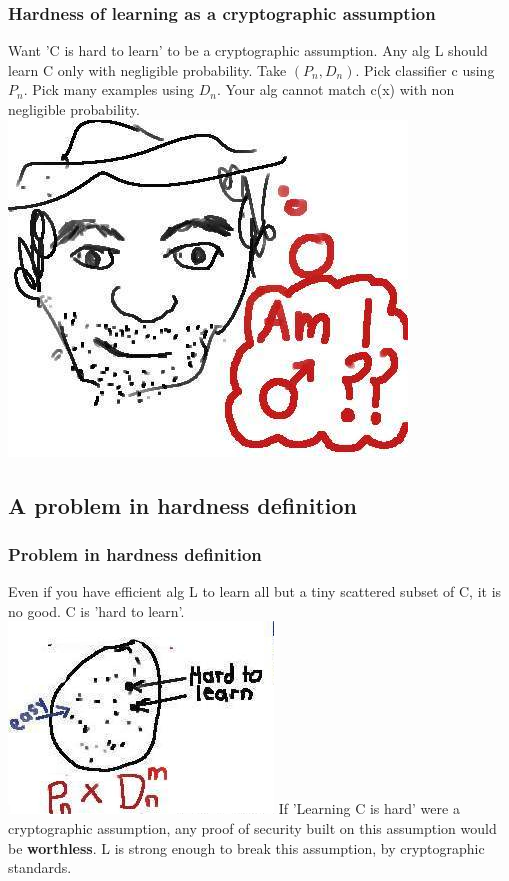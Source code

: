 \documentclass{beamer}
\begin{document}
\begin{frame}
\frametitle{Hardness of learning as a cryptographic assumption}
\begin{itemize}
\pitem Want 'C is hard to learn' to be a cryptographic assumption.
\pitem Any alg L should learn C only with negligible probability.
\pitem Take $(P_{n}, D_{n})$. Pick classifier c using $P_{n}$. Pick many examples using $D_{n}$. Your alg cannot match c(x) with non negligible probability.
\includegraphics[scale=0.065]{images/maleFace.jpg}
\end{itemize}
\end{frame}

\subsection{A problem in hardness definition}
\begin{frame}
\frametitle{Problem in hardness definition}
\begin{itemize}
\pitem Even if you have efficient alg L to learn all but a tiny scattered subset of C, it is no good. C is 'hard to learn'.\\
\includegraphics[scale=0.25]{images/hardToLearnDefnProb.jpg}
\pitem If 'Learning C is hard' were a cryptographic assumption, any proof of security built on this assumption would be \textbf{worthless}. L is strong enough to break this assumption, by cryptographic standards.
\end{itemize}
\end{frame}
\end{document}
